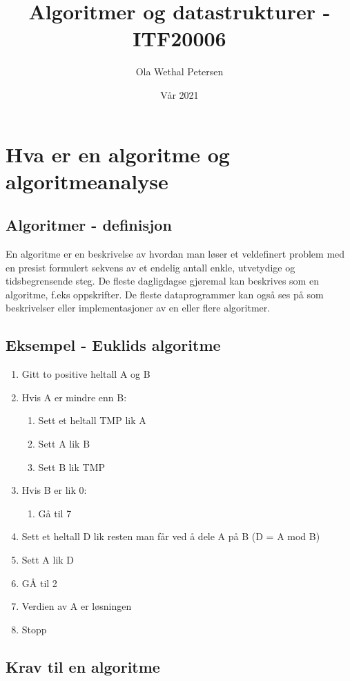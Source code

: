 \documentclass{article}
\begin{document}
    \title{Algoritmer og datastrukturer - ITF20006}
    \author{Ola Wethal Petersen}
    \date{Vår 2021}
    
    \maketitle

    \clearpage

    \tableofcontents
    \clearpage

    \section{Hva er en algoritme og algoritmeanalyse}

    \subsection*{Algoritmer - definisjon}
    En algoritme er en beskrivelse av hvordan man løser et veldefinert problem med en presist formulert sekvens av et endelig antall enkle, utvetydige og tidsbegrensende steg. De fleste dagligdagse gjøremal kan beskrives som en algoritme, f.eks oppskrifter. De fleste dataprogrammer kan også ses på som beskrivelser eller implementasjoner av en eller flere algoritmer. 
    
    \subsection*{Eksempel - Euklids algoritme}
    \begin{enumerate}
        \item Gitt to positive heltall A og B
        \item Hvis A er mindre enn B:
        \begin{enumerate}[label*=\arabic*.]
            \item Sett et heltall TMP lik A
            \item Sett A lik B
            \item Sett B lik TMP
        \end{enumerate}
        \item Hvis B er lik 0:
        \begin{enumerate}[label*=\arabic*.]
            \item Gå til 7
        \end{enumerate}
        \item Sett et heltall D lik resten man får ved å dele A på B (D = A mod B)
        \item Sett A lik D
        \item GÅ til 2
        \item Verdien av A er løsningen
        \item Stopp
    \end{enumerate}

    \subsection*{Krav til en algoritme}
    
\end{document}
